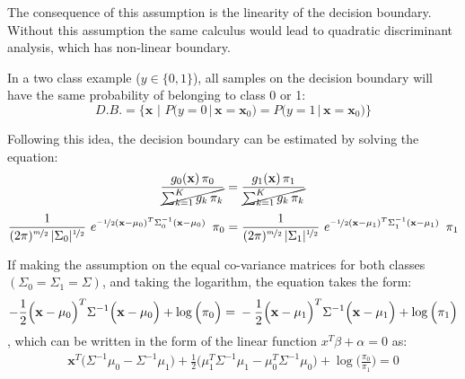 \begin{appendix}
\noindent
The consequence of this assumption is the linearity of the decision boundary. Without this assumption the same calculus would lead to quadratic discriminant analysis, which has non-linear boundary.

In a two class example ($y \in \{0,1\}$), all samples on the decision boundary will have the same probability of belonging to class 0 or 1:
\begin{equation} 
D.B. = \Big\{\mathbf{x}\,\, \Big| \,\,P\big(y=0 \, \big| \, \mathbf{x}=\mathbf{x}_0\big) = P\big(y=1 \, \big| \, \mathbf{x}=\mathbf{x}_0\big) \Big\}
\end{equation}

Following this idea, the decision boundary can be estimated by solving the equation:
\begin{equation} 
\frac{g_0(\mathbf{x}) \, \pi_0} {\cancel{\sum_{k=1}^K{g_k \, \pi_k}}} = \frac{g_1(\mathbf{x}) \, \pi_1} {\cancel{\sum_{k=1}^K{g_k \, \pi_k}}}
\end{equation}
\begin{equation} 
\frac{1}{(2 \pi)^{\nicefrac{m}{2}}\, |\Sigma_0|^{\nicefrac{1}{2}}}\,\, e^{\nicefrac{-1}{2}  (\mathbf{x}-\mu_0)^T  \Sigma_0^{-1} (\mathbf{x}-\mu_0)}  \,\,\,\pi_0 = \\
\frac{1}{(2 \pi)^{\nicefrac{m}{2}}\, |\Sigma_1|^{\nicefrac{1}{2}}}\,\, e^{\nicefrac{-1}{2}  (\mathbf{x}-\mu_1)^T  \Sigma_1^{-1} (\mathbf{x}-\mu_1)}  \,\,\,\pi_1
\end{equation}

If making the assumption on the equal co-variance matrices for both classes $(\Sigma_0 = \Sigma_1  = \Sigma)$, and taking the logarithm, the equation takes the form: 
\begin{equation} 
-\frac{1}{2}  \Big(\mathbf{x}-\mu_0\Big)^T  \Sigma^{-1} \Big(\mathbf{x}-\mu_0\Big) +  \log{\Big(\pi_0\Big)}= \\
-\frac{1}{2}  \Big(\mathbf{x}-\mu_1\Big)^T  \Sigma^{-1} \Big(\mathbf{x}-\mu_1\Big) +  \log{\Big(\pi_1\Big)}
\end{equation}
, which can be written in the form of the linear function $x^T\beta + \alpha = 0$ as:
\begin{equation} 
\begin{split}
\mathbf{x}^T\Big(\Sigma^{-1} \mu_0 - \Sigma^{-1} \mu_1\Big) + \frac{1}{2} \Big(\mu_1^T \Sigma^{-1}\mu_1 - \mu_0^T \Sigma^{-1}\mu_0\Big)
+ \log\Big( \frac{\pi_0}{\pi_1}  \Big) = 0
\end{split}
\end{equation}


\end{appendix}
